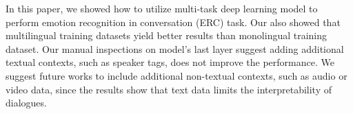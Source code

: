 \documentclass[11pt]{article}
\begin{document}
In this paper, we showed how to utilize multi-task deep learning model to perform emotion recognition in conversation (ERC) task. Our also showed that multilingual training datasets yield better results than monolingual training dataset. Our manual inspections on model's last layer suggest adding additional textual contexts, such as speaker tags, does not improve the performance. We suggest future works to include additional non-textual contexts, such as audio or video data, since the results show that text data limits the interpretability of dialogues.


\end{document}
